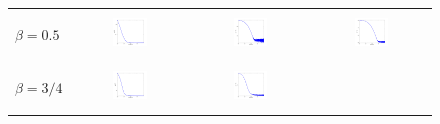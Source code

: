 \renewcommand{\sidecap}[1]{ {\begin{sideways}\parbox{4cm}{\centering #1}\end{sideways}} }

\begin{figure}[!ht]
\begin{center}
\begin{tabular}{lccc}
\sidecap{$\beta=0.5$ } &
\hspace{-0.3cm}\includegraphics[trim=30 10 40 20,clip,width=0.31\textwidth]{images/J_beta05}&
\hspace{-0.5cm}\includegraphics[trim=30 10 40 20,clip,width=0.31\textwidth]{images/Evol_m_beta_05}&
\hspace{-0.5cm}\includegraphics[trim=30 10 40 20,clip,width=0.31\textwidth]{images/Evol_f_beta_05}\\
\sidecap{$\beta=3/4$ } &
\hspace{-0.3cm}\includegraphics[trim=30 10 40 20,clip,width=0.31\textwidth]{images/J_beta075}&
\hspace{-0.5cm}\includegraphics[trim=30 10 40 20,clip,width=0.31\textwidth]{images/Evol_m_beta_075}&

\end{tabular}
\end{center}
\end{figure}
